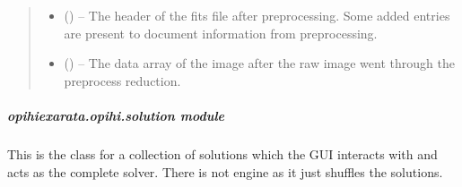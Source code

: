 \documentclass[letterpaper,11pt,english]{sphinxmanual}
\begin{document}
\begin{savenotes}
\begin{fulllineitems}
\begin{savenotes}
\begin{fulllineitems}
\begin{quote}
\begin{description}
\begin{itemize}
\end{itemize}

\sphinxAtStartPar
\begin{itemize}
\item {} 
\sphinxAtStartPar
{} () – The header of the fits file after preprocessing. Some added
entries are present to document information from preprocessing.

\item {} 
\sphinxAtStartPar
{} () – The data array of the image after the raw image went through the
preprocess reduction.

\end{itemize}


\end{description}\end{quote}

\end{fulllineitems}\end{savenotes}


\end{fulllineitems}\end{savenotes}


\sphinxstepscope


\subparagraph{opihiexarata.opihi.solution module}
\label{\detokenize{code/opihiexarata.opihi.solution:module-opihiexarata.opihi.solution}}\label{\detokenize{code/opihiexarata.opihi.solution:opihiexarata-opihi-solution-module}}\label{\detokenize{code/opihiexarata.opihi.solution::doc}}
\sphinxAtStartPar
This is the class for a collection of solutions which the GUI interacts
with and acts as the complete solver. There is not engine as it just shuffles
the solutions.
\end{document}

